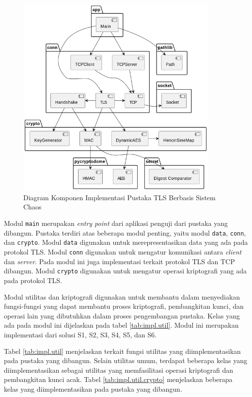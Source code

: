 \begin{figure}[!h]
  \centering
  \includegraphics[width=0.9\textwidth]{chapters/res/chapter-4/impl.component.png}
  \caption{Diagram Komponen Implementasi Pustaka TLS Berbasis Sistem Chaos} \label{fig:impl.overview}
\end{figure}

Modul \texttt{main} merupakan \emph{entry point} dari aplikasi penguji dari pustaka yang dibangun. Pustaka terdiri atas beberapa modul penting, yaitu modul \texttt{data}, \texttt{conn}, dan \texttt{crypto}. Modul \texttt{data} digunakan untuk merepresentasikan data yang ada pada protokol TLS. Modul \texttt{conn} digunakan untuk mengatur komunikasi antara \emph{client} dan \emph{server}. Pada modul ini juga implementasi terkait protokol TLS dan TCP dibangun. Modul \texttt{crypto} digunakan untuk mengatur operasi kriptografi yang ada pada protokol TLS. 

Modul utilitas dan kriptografi digunakan untuk membantu dalam menyediakan fungsi-fungsi yang dapat membantu proses kriptografi, pembangkitan kunci, dan operasi lain yang dibutuhkan dalam proses pengembangan pustaka. Kelas yang ada pada modul ini dijelaskan pada tabel \ref{tab:impl.util}. Modul ini merupakan implementasi dari solusi S1, S2, S3, S4, S5, dan S6.

Tabel \ref{tab:impl.util} menjelaskan terkait fungsi utilitas yang diimplementasikan pada pustaka yang dibangun. Selain utilitas umum, terdapat beberapa kelas yang diimplementasikan sebagai utilitas yang memfasilitasi operasi kriptografi dan pembangkitan kunci acak. Tabel \ref{tab:impl.util.crypto} menjelaskan beberapa kelas yang diimplementasikan pada pustaka yang dibangun. 

